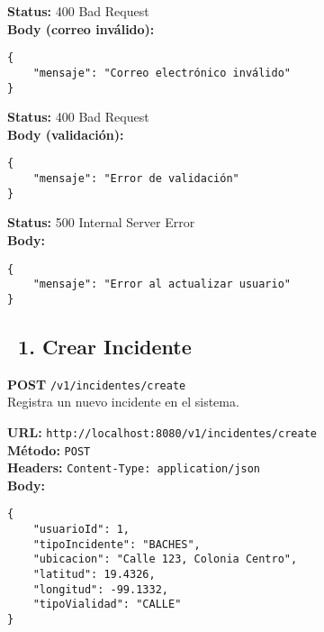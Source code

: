 \begin{tcolorbox}[response]
    \textbf{Status:} 400 Bad Request\\
    \textbf{Body (correo inválido):}
    \begin{verbatim}
{
    "mensaje": "Correo electrónico inválido"
}
    \end{verbatim}
\end{tcolorbox}

\begin{tcolorbox}[response]
    \textbf{Status:} 400 Bad Request\\
    \textbf{Body (validación):}
    \begin{verbatim}
{
    "mensaje": "Error de validación"
}
    \end{verbatim}
\end{tcolorbox}

\begin{tcolorbox}[response]
    \textbf{Status:} 500 Internal Server Error\\
    \textbf{Body:}
    \begin{verbatim}
{
    "mensaje": "Error al actualizar usuario"
}
    \end{verbatim}
\end{tcolorbox}


\subsection*{\faServer\ 1. Crear Incidente}
\begin{tcolorbox}[endpoint]
    \textbf{POST} \texttt{/v1/incidentes/create}\\
    Registra un nuevo incidente en el sistema.
\end{tcolorbox}

\begin{tcolorbox}[request]
    \textbf{URL:} \textcolor{urlColor}{\texttt{http://localhost:8080/v1/incidentes/create}}\\
    \textbf{Método:} \textcolor{methodColor}{\texttt{POST}}\\
    \textbf{Headers:} \textcolor{headerColor}{\texttt{Content-Type: application/json}}\\
    \textbf{Body:}
    \begin{verbatim}
{
    "usuarioId": 1,
    "tipoIncidente": "BACHES",
    "ubicacion": "Calle 123, Colonia Centro",
    "latitud": 19.4326,
    "longitud": -99.1332,
    "tipoVialidad": "CALLE"
}
    \end{verbatim}
\end{tcolorbox}

